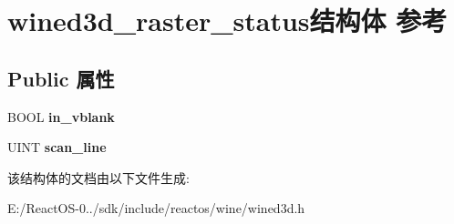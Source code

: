 \hypertarget{structwined3d__raster__status}{}\section{wined3d\+\_\+raster\+\_\+status结构体 参考}
\label{structwined3d__raster__status}
\subsection*{Public 属性}
\begin{DoxyCompactItemize}
\item 
\mbox{\label{structwined3d__raster__status_a35c6e3760ccb41a77fcaf94041a18c82}} 
B\+O\+OL {\bfseries in\+\_\+vblank}
\item 
\mbox{\label{structwined3d__raster__status_a5c6a0ec8b28ddc59e3e8238863e1568d}} 
U\+I\+NT {\bfseries scan\+\_\+line}
\end{DoxyCompactItemize}


该结构体的文档由以下文件生成\+:\begin{DoxyCompactItemize}
\item 
E\+:/\+React\+O\+S-\/0../sdk/include/reactos/wine/wined3d.\+h\end{DoxyCompactItemize}
